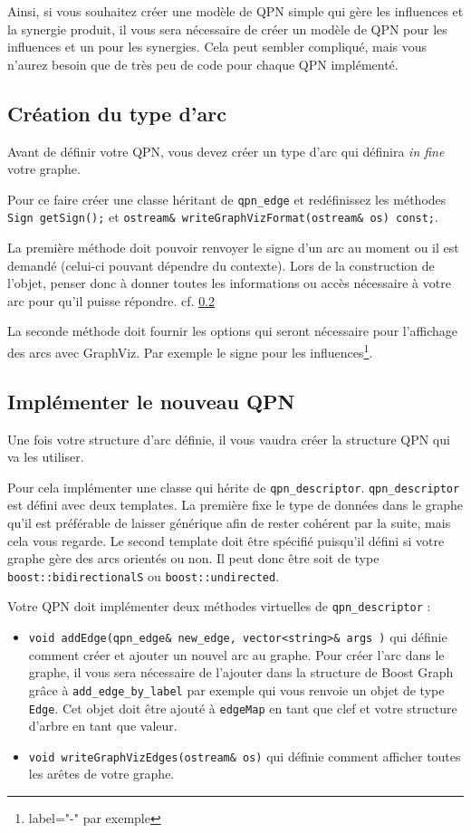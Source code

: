 \documentclass[11pt, a4paper]{article}
\begin{document}
Ainsi, si vous souhaitez créer une modèle de QPN simple qui gère les influences et la synergie produit, il vous sera nécessaire de créer un modèle de QPN pour les influences et un pour les synergies. Cela peut sembler compliqué, mais vous n'aurez besoin que de très peu de code pour chaque QPN implémenté.

\subsection{Création du type d'arc}
Avant de définir votre QPN, vous devez créer un type d'arc qui définira \emph{in fine} votre graphe. 

Pour ce faire créer une classe héritant de \texttt{qpn\_edge} et redéfinissez les méthodes \texttt{Sign getSign();} et \texttt{ostream\& writeGraphVizFormat(ostream\& os) const;}.

La première méthode doit pouvoir renvoyer le signe d'un arc au moment ou il est demandé (celui-ci pouvant dépendre du contexte). Lors de la construction de l'objet, penser donc à donner toutes les informations ou accès nécessaire à votre arc pour qu'il puisse répondre. cf. \ref{subsec:implement_new_qpn}

La seconde méthode doit fournir les options qui seront nécessaire pour l'affichage des arcs avec GraphViz. Par exemple le signe pour les influences\footnote{label="-" par exemple}.

\subsection{Implémenter le nouveau QPN}\label{subsec:implement_new_qpn}
Une fois votre structure d'arc définie, il vous vaudra créer la structure QPN qui va les utiliser.

Pour cela implémenter une classe qui hérite de \texttt{qpn\_descriptor}. \texttt{qpn\_descriptor} est défini avec deux templates. La première fixe le type de données dans le graphe qu'il est préférable de laisser générique afin de rester cohérent par la suite, mais cela vous regarde. Le second template doit être spécifié puisqu'il défini si votre graphe gère des arcs orientés ou non. Il peut donc être soit de type \texttt{boost::bidirectionalS} ou \texttt{boost::undirected}.

Votre QPN doit implémenter deux méthodes virtuelles de \texttt{qpn\_descriptor} :
\begin{itemize}
\item \texttt{void addEdge(qpn\_edge\& new\_edge,  vector<string>\& args )} qui définie comment créer et ajouter un nouvel arc au graphe. Pour créer l'arc dans le graphe, il vous sera nécessaire de l'ajouter dans la structure de Boost Graph grâce à \texttt{add\_edge\_by\_label} par exemple qui vous renvoie un objet de type \texttt{Edge}. Cet objet doit être ajouté à \texttt{edgeMap} en tant que clef et votre structure d'arbre en tant que valeur.

\item \texttt{void writeGraphVizEdges(ostream\& os)} qui définie comment afficher toutes les arêtes de votre graphe.
\end{itemize}
\end{document}
